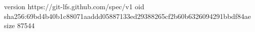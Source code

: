 version https://git-lfs.github.com/spec/v1
oid sha256:69bd4b40b1c88071aaddd05887133ed29388265cf2b60b6326094291bbdf84ae
size 87544
